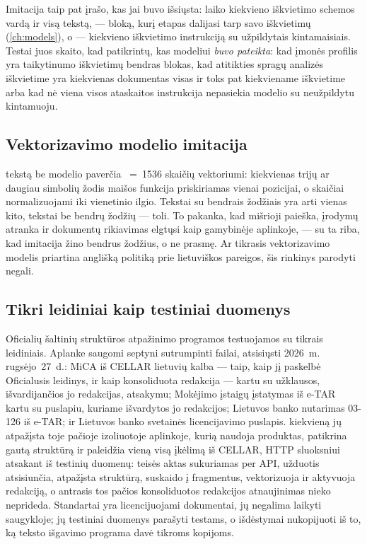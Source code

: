 Imitacija taip pat įrašo, kas jai buvo išsiųsta:  laiko kiekvieno iškvietimo
schemos vardą ir visą tekstą,  --- bloką, kurį etapas dalijasi tarp savo
iškvietimų (\cref{ch:models}), o  --- kiekvieno iškvietimo instrukciją
su užpildytais kintamaisiais. Testai juos skaito, kad patikrintų, kas modeliui \emph{buvo
pateikta}: kad įmonės profilis yra taikytinumo iškvietimų bendras blokas, kad atitikties
spragų analizės iškvietime yra kiekvienas dokumentas visas ir toks pat kiekviename iškvietime
arba kad nė viena visos ataskaitos instrukcija nepasiekia modelio su neužpildytu kintamuoju.

\subsection{Vektorizavimo modelio imitacija}\label{sec:testing:api:embed}

 tekstą be modelio paverčia ~=~1536 skaičių vektoriumi:
kiekvienas trijų ar daugiau simbolių žodis maišos funkcija priskiriamas vienai pozicijai, o
skaičiai normalizuojami iki vienetinio ilgio. Tekstai su bendrais žodžiais yra arti vienas
kito, tekstai be bendrų žodžių --- toli. To pakanka, kad mišrioji paieška, įrodymų atranka ir
dokumentų rikiavimas elgtųsi kaip gamybinėje aplinkoje, --- su ta riba, kad imitacija žino
bendrus žodžius, o ne prasmę. Ar tikrasis vektorizavimo modelis priartina anglišką politiką prie
lietuviškos pareigos, šis rinkinys parodyti negali.

\subsection{Tikri leidiniai kaip testiniai duomenys}\label{sec:testing:api:fixtures}

Oficialių šaltinių struktūros atpažinimo programos testuojamos su tikrais leidiniais. Aplanke
 saugomi septyni sutrumpinti failai, atsisiųsti 2026~m.
rugsėjo~27~d.: MiCA iš CELLAR lietuvių kalba --- taip, kaip jį paskelbė Oficialusis leidinys, ir
kaip konsoliduota redakcija --- kartu su užklausos, išvardijančios jo redakcijas, atsakymu;
Mokėjimo įstaigų įstatymas iš e-TAR kartu su puslapiu, kuriame išvardytos jo redakcijos;
Lietuvos banko nutarimas 03-126 iš e-TAR; ir Lietuvos banko svetainės licencijavimo puslapis.
 kiekvieną jų atpažįsta toje pačioje izoliuotoje aplinkoje, kurią
naudoja produktas, patikrina gautą struktūrą ir paleidžia vieną visą įkėlimą iš CELLAR, HTTP
sluoksniui atsakant iš testinių duomenų: teisės aktas sukuriamas per API, užduotis atsisiunčia,
atpažįsta struktūrą, suskaido į fragmentus, vektorizuoja ir aktyvuoja redakciją, o antrasis tos
pačios konsoliduotos redakcijos atnaujinimas nieko neprideda. Standartai yra licencijuojami
dokumentai, jų negalima laikyti saugykloje; jų testiniai duomenys parašyti testams, o išdėstymai
nukopijuoti iš to, ką teksto išgavimo programa davė tikroms kopijoms.


